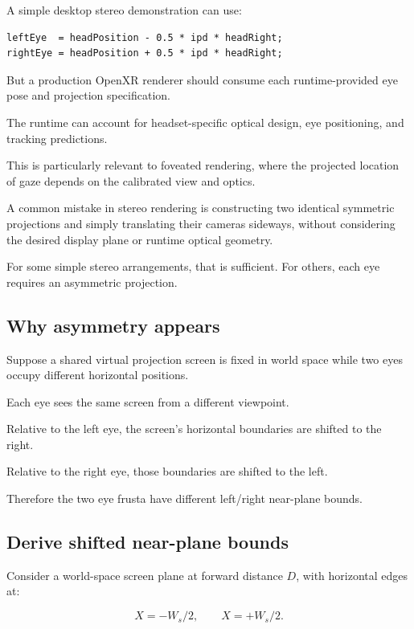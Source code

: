 A simple desktop stereo demonstration can use:

\begin{verbatim}
leftEye  = headPosition - 0.5 * ipd * headRight;
rightEye = headPosition + 0.5 * ipd * headRight;
\end{verbatim}

But a production OpenXR renderer should consume each runtime-provided eye pose and projection specification.

The runtime can account for headset-specific optical design, eye positioning, and tracking predictions.

This is particularly relevant to foveated rendering, where the projected location of gaze depends on the calibrated view and optics.

A common mistake in stereo rendering is constructing two identical symmetric projections and simply translating their cameras sideways, without considering the desired display plane or runtime optical geometry.

For some simple stereo arrangements, that is sufficient. For others, each eye requires an asymmetric projection.

\subsection{Why asymmetry appears}\label{02-foundations-ii-ch035-why-asymmetry-appears}

Suppose a shared virtual projection screen is fixed in world space while two eyes occupy different horizontal positions.

Each eye sees the same screen from a different viewpoint.

Relative to the left eye, the screen's horizontal boundaries are shifted to the right.

Relative to the right eye, those boundaries are shifted to the left.

Therefore the two eye frusta have different left/right near-plane bounds.

\subsection{Derive shifted near-plane bounds}\label{02-foundations-ii-ch035-derive-shifted-near-plane-bounds}

Consider a world-space screen plane at forward distance \(D\), with horizontal edges at:

\[ X=-W_s/2,\qquad X=+W_s/2. \]

